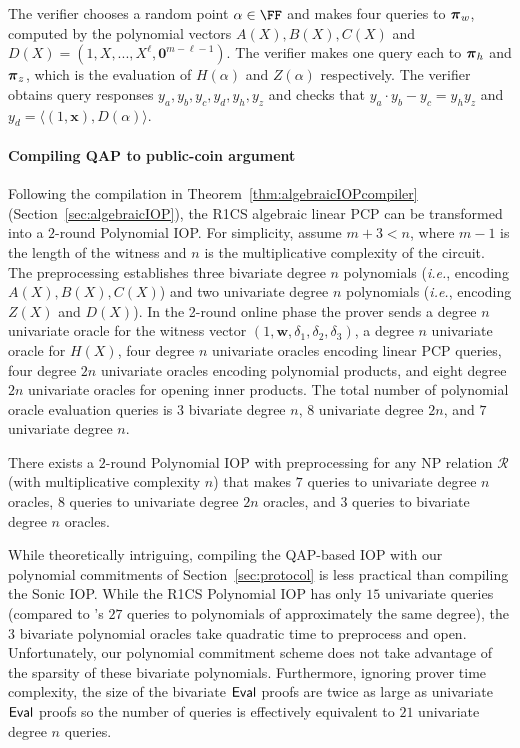 The verifier chooses a random point $\alpha \in \FF$ and makes four queries to $\boldsymbol{\pi}_w$, computed by the polynomial vectors $A(X), B(X), C(X)$ and $D(X) = (1, X,...,X^\ell, \mathbf{0}^{m- \ell -1})$. The verifier makes one query each to $\boldsymbol{\pi}_h$ and $\boldsymbol{\pi}_z$, which is the evaluation of $H(\alpha)$ and $Z(\alpha)$ respectively. The verifier obtains query responses $y_a, y_b, y_c, y_d, y_h, y_z$ and checks that $y_a \cdot y_b - y_c = y_h y_z$ and $y_d = \langle (1, \mathbf{x}), D(\alpha) \rangle$. 

\paragraph{Compiling QAP to public-coin argument} 

Following the compilation in Theorem~\ref{thm:algebraicIOPcompiler} (Section~\ref{sec:algebraicIOP}), the R1CS algebraic linear PCP can be transformed into a $2$-round Polynomial IOP. For simplicity, assume $m+3 < n$, where $m-1$ is the length of the witness and $n$ is the multiplicative complexity of the circuit. The preprocessing establishes three bivariate degree $n$ polynomials (\emph{i.e.}, encoding $A(X), B(X), C(X)$) and two univariate degree $n$ polynomials (\emph{i.e.}, encoding $Z(X)$ and $D(X)$). In the 2-round online phase the prover sends a degree $n$ univariate oracle for the witness vector $(1, \mathbf{w}, \delta_1, \delta_2, \delta_3)$, a degree $n$ univariate oracle for $H(X)$, four degree $n$ univariate oracles encoding linear PCP queries, four degree $2n$ univariate oracles encoding polynomial products, and eight degree $2n$ univariate oracles for opening inner products. The total number of polynomial oracle evaluation queries is $3$ bivariate degree $n$, $8$ univariate degree $2n$, and $7$ univariate degree $n$.

\begin{theorem}
There exists a $2$-round Polynomial IOP with preprocessing for any NP relation $\mathcal{R}$ (with multiplicative complexity $n$) that makes $7$ queries to univariate degree $n$ oracles, $8$ queries to univariate degree $2n$ oracles, and $3$ queries to bivariate degree $n$ oracles.  
\end{theorem}
 
While theoretically intriguing, compiling the QAP-based IOP with our polynomial commitments of Section~\ref{sec:protocol} is less practical than compiling the \textsf{Sonic} IOP. While the R1CS Polynomial IOP has only $15$ univariate queries (compared to 's $27$ queries to polynomials of approximately the same degree), the $3$ bivariate polynomial oracles take quadratic time to preprocess and open. Unfortunately, our polynomial commitment scheme does not take advantage of the sparsity of these bivariate polynomials. Furthermore, ignoring prover time complexity, the size of the bivariate $\textsf{{Eval}}$ proofs are twice as large as univariate $\textsf{{Eval}}$ proofs so the number of queries is effectively equivalent to $21$ univariate degree $n$ queries. 